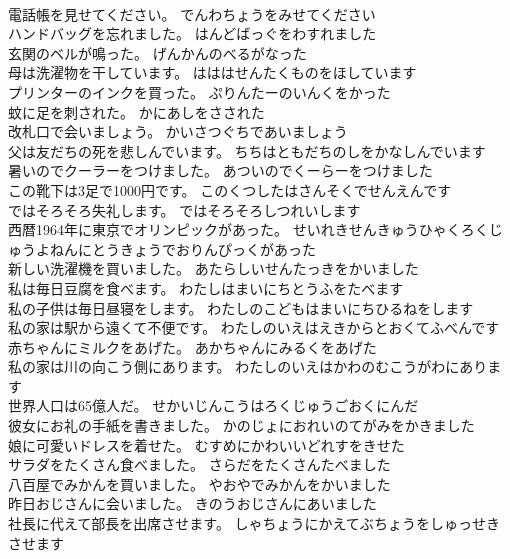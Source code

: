 \documentclass[8pt]{extreport}
\begin{document}
\begin{CJK}{UTF8}{min}
\\	電話帳を見せてください。	でんわちょうをみせてください 
\\	ハンドバッグを忘れました。	はんどばっぐをわすれました 
\\	玄関のベルが鳴った。	げんかんのべるがなった 
\\	母は洗濯物を干しています。	はははせんたくものをほしています 
\\	プリンターのインクを買った。	ぷりんたーのいんくをかった 
\\	蚊に足を刺された。	かにあしをさされた 
\\	改札口で会いましょう。	かいさつぐちであいましょう 
\\	父は友だちの死を悲しんでいます。	ちちはともだちのしをかなしんでいます 
\\	暑いのでクーラーをつけました。	あついのでくーらーをつけました 
\\	この靴下は3足で1000円です。	このくつしたはさんそくでせんえんです 
\\	ではそろそろ失礼します。	ではそろそろしつれいします 
\\	西暦1964年に東京でオリンピックがあった。	せいれきせんきゅうひゃくろくじゅうよねんにとうきょうでおりんぴっくがあった 
\\	新しい洗濯機を買いました。	あたらしいせんたっきをかいました 
\\	私は毎日豆腐を食べます。	わたしはまいにちとうふをたべます 
\\	私の子供は毎日昼寝をします。	わたしのこどもはまいにちひるねをします 
\\	私の家は駅から遠くて不便です。	わたしのいえはえきからとおくてふべんです 
\\	赤ちゃんにミルクをあげた。	あかちゃんにみるくをあげた 
\\	私の家は川の向こう側にあります。	わたしのいえはかわのむこうがわにあります 
\\	世界人口は65億人だ。	せかいじんこうはろくじゅうごおくにんだ 
\\	彼女にお礼の手紙を書きました。	かのじょにおれいのてがみをかきました 
\\	娘に可愛いドレスを着せた。	むすめにかわいいどれすをきせた 
\\	サラダをたくさん食べました。	さらだをたくさんたべました 
\\	八百屋でみかんを買いました。	やおやでみかんをかいました 
\\	昨日おじさんに会いました。	きのうおじさんにあいました 
\\	社長に代えて部長を出席させます。	しゃちょうにかえてぶちょうをしゅっせきさせます 

\end{CJK}
\end{document}
